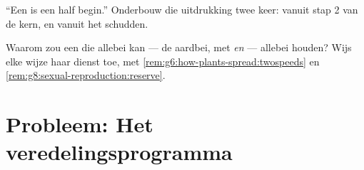 \begin{exercise}[$\star\star$]\label{exo:g8:sexual-reproduction:11}
``Een  is een half begin.'' Onderbouw die uitdrukking twee keer:
vanuit stap 2 van de kern, en vanuit het schudden.
\end{exercise}

\begin{exercise}[$\star\star\star$]\label{exo:g8:sexual-reproduction:12}
Waarom zou een  die allebei kan --- de aardbei, met 
\emph{en}  --- allebei houden? Wijs elke wijze haar dienst toe, met
\cref{rem:g6:how-plants-spread:twospeeds} en
\cref{rem:g8:sexual-reproduction:reserve}.
\end{exercise}

\section{Probleem: Het veredelingsprogramma}

